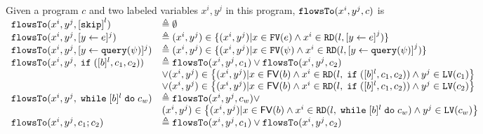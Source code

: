 \begin{defn}
  \label{def:feasible_flowsto}
  Given a program $c$ and two labeled variables $x^i, y^j$  in this program, 
  $\mathtt{flowsTo}(x^i, y^j, c)$ is 
  \\
    {\footnotesize
$  \begin{array}{ll}
  \flowsto(x^i, y^j, \clabel{\eskip}^{l}) 
  &\triangleq \emptyset \\
  \flowsto(x^i, y^j, \clabel{\assign{y}{\expr}}{}^j) 
  & \triangleq (x^i, y^j) \in \{ (x^i, y^j) | x \in \kw{FV}(\expr) 
  \land x^i \in \live(l, \clabel{\assign{y}{\expr}}^j) \} \\
  \flowsto(x^i, y^j, \clabel{\assign{y}{\query(\qexpr)}}{}^j) 
  & \triangleq (x^i, y^j) \in \{ (x^i, y^j) | x \in \kw{FV}(\qexpr) 
  \land x^i \in \live(l,\clabel{\assign{y}{\query(\qexpr)}}^j) \} \\
    \flowsto(x^i, y^j, \eif ([b]^l, c_1, c_2))  & \triangleq \flowsto(x^i, y^j, c_1) \lor \flowsto(x^i, y^j, c_2) \\ 
        & \lor (x^i, y^j) \in
        \left\{(x^i,y^j) | x \in \mathsf{FV}(b) \land 
      x^i \in \live(l, \eif ([b]^l, c_1, c_2)) \land  y^j \in \lvar(c_1) \right\} \\
       &\lor (x^i, y^j) \in \left\{(x^i,y^j) | x \in \mathsf{FV}(b) \land 
      x^i\in \live(l, \eif ([b]^l, c_1, c_2))  \land  y^j \in \lvar(c_2)  \right\} \\
       \flowsto(x^i, y^j, \ewhile [b]^l \edo c_w)  & \triangleq  \flowsto(x^i, y^j, c_w)  \lor
       \\ & 
       (x^i, y^j) \in  \left\{(x^i,y^j) | x \in \mathsf{FV}(b) \land 
      x^i \in \live(l,   \ewhile [b]^l \edo c_w) \land  y^j \in \lvar(c_w) \right\} \\
       \flowsto(x^i, y^j, c_1 ;c_2)  & \triangleq \flowsto(x^i, y^j, c_1) \lor \flowsto(x^i, y^j, c_2) \\
   \end{array}$
   }
   \end{defn}
